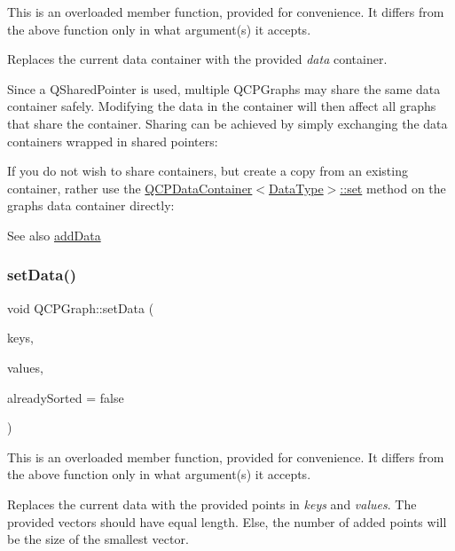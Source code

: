 This is an overloaded member function, provided for convenience. It differs from the above function only in what argument(s) it accepts.

Replaces the current data container with the provided {\itshape data} container.

Since a Q\+Shared\+Pointer is used, multiple Q\+C\+P\+Graphs may share the same data container safely. Modifying the data in the container will then affect all graphs that share the container. Sharing can be achieved by simply exchanging the data containers wrapped in shared pointers\+: 
\begin{DoxyCodeInclude}
\end{DoxyCodeInclude}
 If you do not wish to share containers, but create a copy from an existing container, rather use the \hyperlink{class_q_c_p_data_container_ae7042bd534fc3ce7befa2ce3f790b5bf}{Q\+C\+P\+Data\+Container$<$\+Data\+Type$>$\+::set} method on the graph\textquotesingle{}s data container directly\+: 
\begin{DoxyCodeInclude}
\end{DoxyCodeInclude}
 \begin{DoxySeeAlso}{See also}
\hyperlink{class_q_c_p_graph_ae0555c0d3fe0fa7cb8628f88158d420f}{add\+Data} 
\end{DoxySeeAlso}
\mbox{\label{class_q_c_p_graph_a73578d786532132310a926c3cd529b29}} 
\subsubsection{\texorpdfstring{set\+Data()}{setData()}\hspace{0.1cm}{\footnotesize\ttfamily [2/2]}}
{\footnotesize\ttfamily void Q\+C\+P\+Graph\+::set\+Data (\begin{DoxyParamCaption}\item[{const Q\+Vector$<$ double $>$ \&}]{keys,  }\item[{const Q\+Vector$<$ double $>$ \&}]{values,  }\item[{bool}]{already\+Sorted = {\ttfamily false} }\end{DoxyParamCaption})}

This is an overloaded member function, provided for convenience. It differs from the above function only in what argument(s) it accepts.

Replaces the current data with the provided points in {\itshape keys} and {\itshape values}. The provided vectors should have equal length. Else, the number of added points will be the size of the smallest vector.

